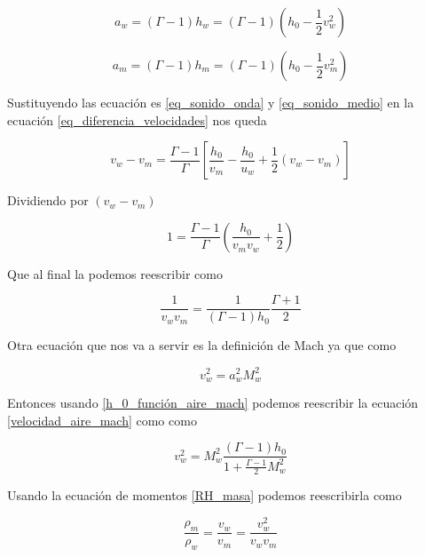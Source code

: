 \documentclass[12pt,a4paper]{book}
\begin{document}
\begin{equation} \label{eq_sonido_onda}
  a_w = \left( \Gamma-1 \right) h_w = \left( \Gamma-1 \right) \left( h_0 -\frac{1}{2} v_w^2 \right)
\end{equation}

\begin{equation} \label{eq_sonido_medio}
  a_m = \left( \Gamma-1 \right) h_m = \left( \Gamma-1 \right) \left( h_0 -\frac{1}{2} v_m^2 \right)
\end{equation}

Sustituyendo las ecuación  es \ref{eq_sonido_onda} y \ref{eq_sonido_medio} en la ecuación \ref{eq_diferencia_velocidades}
nos queda

\begin{equation}
  v_w-v_m = \frac{\Gamma - 1}{\Gamma} \left[ \frac{h_0}{v_m} - \frac{h_0}{u_w} + \frac{1}{2} \left( v_w - v_m\right) \right]
\end{equation}

Dividiendo por $ \left( v_w - v_m \right)$

\begin{equation}
  1 = \frac{\Gamma - 1}{\Gamma} \left( \frac{h_0}{v_m v_w} + \frac{1}{2} \right)
\end{equation}

Que al final la podemos reescribir como

\begin{equation} \label{eq_denominador}
  \frac{1}{v_w v_m} = \frac{1}{\left( \Gamma -1\right) h_0} \frac{\Gamma + 1}{2}
\end{equation}

Otra ecuación que nos va a servir es la definición de Mach ya que como

\begin{equation}\label{velocidad_aire_mach}
  v_w^2 = a_w^2 M_w^2
\end{equation}

Entonces usando \ref{h_0_función_aire_mach} podemos reescribir la ecuación \ref{velocidad_aire_mach} como
como

\begin{equation} \label{eq_numerador}
  v_w^2 = M_w^2 \frac{\left( \Gamma -1 \right) h_0}{1+\frac{\Gamma - 1}{2} M_w^2}
\end{equation}

Usando la ecuación de momentos \ref{RH_masa} podemos reescribirla como

\begin{equation} \label{eq_fraccion_momentos}
  \frac{\rho_m }{\rho_w} = \frac{ v_w}{v_m} = \frac{v_w^2}{v_w v_m}
\end{equation}
\end{document}

